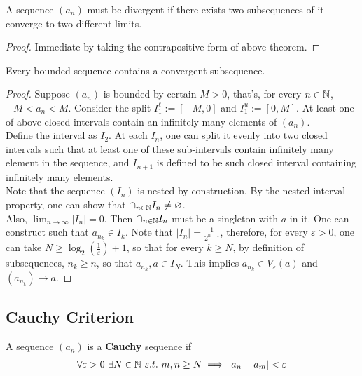 \documentclass[11pt]{article}
\begin{document}
	\begin{corollary}
		A sequence $(a_n)$ must be divergent if there exists two subsequences of it converge to two different limits.
	\end{corollary}
	
	\begin{proof}
		Immediate by taking the contrapositive form of above theorem.
	\end{proof}
	
	\begin{theorem}
		Every bounded sequence contains a convergent subsequence.
	\end{theorem}
	
	\begin{proof}
		Suppose $(a_n)$ is bounded by certain $M > 0$, that's, for every $n \in \mathbb{N}$, $-M < a_n < M$. Consider the split $I_1^\ell := [-M, 0]$ and $I_1^u := [0, M]$. At least one of above closed intervals contain an infinitely many elements of $(a_n)$.\\
		Define the interval as $I_2$. At each $I_n$, one can split it evenly into two closed intervals such that at least one of these sub-intervals contain infinitely many element in the sequence, and $I_{n+1}$ is defined to be such closed interval containing infinitely many elements.\\
		Note that the sequence $(I_n)$ is nested by construction. By the nested interval property, one can show that $\cap_{n \in \mathbb{N}} I_n \neq \varnothing$.\\
		Also, $\lim_{n \to \infty} |I_n| = 0$. Then $\cap_{n \in \mathbb{N}} I_n$ must be a singleton with $a$ in it. One can construct such that $a_{n_k} \in I_k$. Note that $|I_n| = \frac{1}{2^{n-1}}$, therefore, for every $\varepsilon > 0$, one can take $N \geq \log_2 \left({\frac{1}{\varepsilon}}\right) + 1$, so that for every $k \geq N$, by definition of subsequences, $n_k \geq n$, so that $a_{n_k}, a \in I_N$. This implies $a_{n_k} \in V_{\varepsilon}(a)$ and $(a_{n_k}) \to a$.
	\end{proof}
	
	\subsection{Cauchy Criterion}
	\begin{definition}
		A sequence $(a_n)$ is a \textbf{Cauchy} sequence if
		\begin{align}
			\forall \varepsilon > 0\ \exists N \in \mathbb{N}\ s.t.\ m, n \geq N \implies |a_n - a_m| < \varepsilon
		\end{align}
	\end{definition}
	
\end{document}
